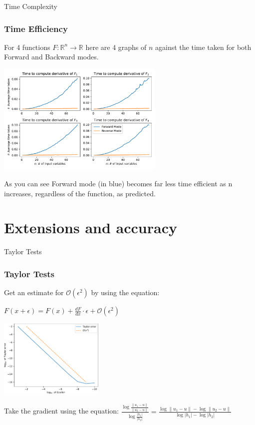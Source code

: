 \documentclass{beamer}
\begin{document}
\begin{frame}{Time Complexity}
\frametitle{Time Efficiency}
For 4 functions $F: \mathbb{R}^n \rightarrow \mathbb{R}$
here are 4 graphs of $n$ against the time taken for both Forward and Backward modes.
\begin{center}
    \includegraphics[width=8cm]{images/Graph_TimeDiff.pdf}
\end{center}

As you can see Forward mode (in blue) becomes far less time efficient as n increases, regardless of the function, as predicted.
\end{frame}


\section{Extensions and accuracy}


\begin{frame}{Taylor Tests}
\frametitle{Taylor Tests}
Get an estimate for $\mathcal{O}(\epsilon ^ 2)$ by using the equation:
\begin{center}
    $F(x + \epsilon) = F(x) + \frac{dF}{dx} \cdot \epsilon + \mathcal{O}(\epsilon ^ 2)$
\end{center}

\begin{center}
    \includegraphics[width=5cm]{images/taylor_error_1.pdf}
\end{center}

Take the gradient using the equation: $\frac{\log{\frac{\|u_1 - u\|}{\|u_2 - u\|}}}{\log{\frac{|h_1|}{|h_2|}}} = \frac{\log\|u_1 - u\| - \log\|u_2 - u\|}{\log|h_1| - \log|h_2|}$
\end{frame}
\end{document}
